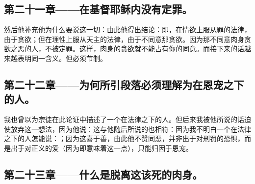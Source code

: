 
\subsection{第二十一章——在基督耶稣内没有定罪。}

然后他补充他为什么要说这一切：由此他得出结论：即，在情欲上服从罪的法律，由于贪欲；但在理性上服从天主的法律，由于不同意那贪欲。因为那不同意肉身贪欲之恶的人，不被定罪。这样，肉身的贪欲就不能占有你的同意。而接下来的话越来越表明同一含义。但必须节制。\par


\subsection{第二十二章——为何所引段落必须理解为在恩宠之下的人。}

我也曾以为宗徒在此论证中描述了一个在法律之下的人。但后来我被他所说的话迫使放弃这一想法，因为他说：这与他随后所说的也相符：因为我不明白一个在法律之下的人怎能说：；因为这喜于善，由此他不赞同恶，并非出于对刑罚的恐惧，而是出于对正义的爱（因为即意味着这一点），只能归因于恩宠。\par


\subsection{第二十三章——什么是脱离这该死的肉身。}

